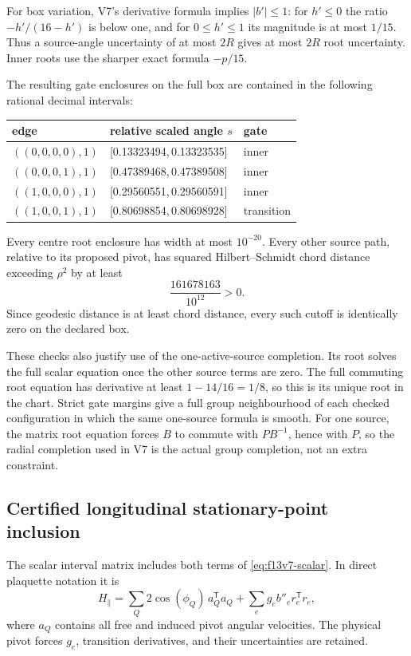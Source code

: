 \documentclass[11pt,oneside]{article}
\begin{document}
For box variation, V7's derivative formula
implies \(|b'|\le1\): for \(h'\le0\) the
ratio \(-h'/(16-h')\) is below one, and
for \(0\le h'\le1\) its magnitude is at
most \(1/15\). Thus a source-angle uncertainty
of at most \(2R\) gives at most \(2R\) root
uncertainty. Inner roots use the sharper
exact formula \(-p/15\).

The resulting gate enclosures on the full
box are contained in the following rational
decimal intervals:
\begin{center}\small
\begin{tabular}{lll}
\toprule
edge&relative scaled angle \(s\)&gate\\
\midrule
\(((0,0,0,0),1)\)&[0.13323494,\,0.13323535]&inner\\
\(((0,0,0,1),1)\)&[0.47389468,\,0.47389508]&inner\\
\(((1,0,0,0),1)\)&[0.29560551,\,0.29560591]&inner\\
\(((1,0,0,1),1)\)&[0.80698854,\,0.80698928]&transition\\
\bottomrule
\end{tabular}
\end{center}
Every centre root enclosure has width at
most \(10^{-20}\). Every other source path,
relative to its proposed pivot, has squared
Hilbert--Schmidt chord distance exceeding
\(\rho^2\) by at least
\[
 \frac{161678163}{10^{12}}>0 .
\]
Since geodesic distance is at least chord
distance, every such cutoff is identically
zero on the declared box.

These checks also justify use of the
one-active-source completion. Its root
solves the full scalar equation once the
other source terms are zero. The full
commuting root equation has derivative at
least \(1-14/16=1/8\), so this is its unique
root in the chart. Strict gate margins give
a full group neighbourhood of each checked
configuration in which the same one-source
formula is smooth. For one source, the
matrix root equation forces \(B\) to commute
with \(PB^{-1}\), hence with \(P\), so the
radial completion used in V7 is the actual
group completion, not an extra constraint.

\subsection{Certified longitudinal stationary-point inclusion}

The scalar interval matrix includes both
terms of \eqref{eq:f13v7-scalar}. In direct
plaquette notation it is
\[
 H_\parallel
 =\sum_Q2\cos(\phi_Q)\,a_Q^{\mathsf T}a_Q
       +\sum_e g_eb''_er_e^{\mathsf T}r_e ,
\]
where \(a_Q\) contains all free and induced
pivot angular velocities. The physical
pivot forces \(g_e\), transition derivatives,
and their uncertainties are retained.
\end{document}
